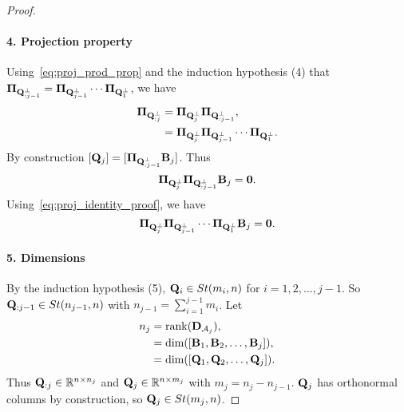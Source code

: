\begin{proof}
    \paragraph{4. Projection property} Using~\cref{eq:proj_prod_prop} and the induction hypothesis (4) that $\boldsymbol{\Pi}_{\mathbf{Q}_{:j-1}^\perp} = \boldsymbol{\Pi}_{\mathbf{Q}^\perp_{j-1}} \cdots \boldsymbol{\Pi}_{\mathbf{Q}^\perp_1}$, we have
    \begin{align}\label{eq:proj_identity_proof}
    \begin{aligned}
         \boldsymbol{\Pi}_{\mathbf{Q}_{:j}^\perp} &= \boldsymbol{\Pi}_{\mathbf{Q}^\perp_j} \boldsymbol{\Pi}_{\mathbf{Q}_{:j-1}^\perp},\\
               &= \boldsymbol{\Pi}_{\mathbf{Q}^\perp_j} \boldsymbol{\Pi}_{\mathbf{Q}^\perp_{j-1}}\cdots \boldsymbol{\Pi}_{\mathbf{Q}^\perp_1}.
   \end{aligned}
    \end{align}
    By construction $[\mathbf{Q}_j] = [\boldsymbol{\Pi}_{\mathbf{Q}_{:j-1}^\perp}\mathbf{B}_j]$. Thus 
    \begin{equation*}
        \boldsymbol{\Pi}_{\mathbf{Q}^\perp_j}\boldsymbol{\Pi}_{\mathbf{Q}_{:j-1}^\perp}\mathbf{B}_j = \bm{0}.
    \end{equation*}
    Using~\cref{eq:proj_identity_proof}, we have
    \begin{equation*}
        \boldsymbol{\Pi}_{\mathbf{Q}^\perp_j} \boldsymbol{\Pi}_{\mathbf{Q}^\perp_{j-1}}\cdots \boldsymbol{\Pi}_{\mathbf{Q}^\perp_1}\mathbf{B}_j = \bm{0}.
    \end{equation*}    
    
    

    \paragraph{5. Dimensions} By the induction hypothesis (5), $\mathbf{Q}_i \in St(m_i,n)$ for $i=1,2,\dots,j-1$. So $\mathbf{Q}_{:j-1} \in St(n_{j-1},n)$ with $n_{j-1} = \sum_{i=1}^{j-1} m_i$. Let 
    \begin{align*}
        n_j &= \mathrm{rank}(\mathbf{D}_{\mathcal{A}_j}), \\
        &= \mathrm{dim}([\mathbf{B}_1,\mathbf{B}_2,\dots,\mathbf{B}_j]),\\
        &= \mathrm{dim}([\mathbf{Q}_1,\mathbf{Q}_2,\dots,\mathbf{Q}_j]).
    \end{align*}
    Thus $\mathbf{Q}_{:j} \in \mathbb{R}^{n \times n_j}$ and $\mathbf{Q}_j \in \mathbb{R}^{n \times m_j}$ with $m_j = n_j - n_{j-1}$. $\mathbf{Q}_j$ has orthonormal columns by construction, so $\mathbf{Q}_j \in St(m_j,n)$.


\end{proof}
